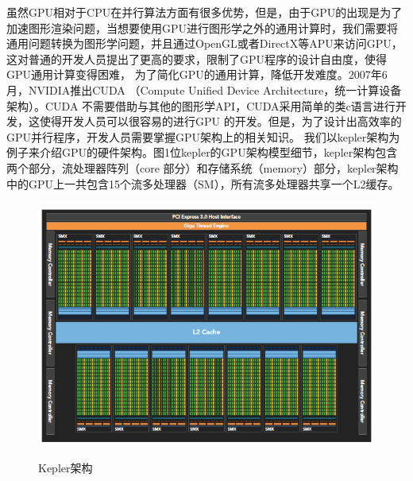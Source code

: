 虽然GPU相对于CPU在并行算法方面有很多优势，但是，由于GPU的出现是为了加速图形渲染问题，当想要使用GPU进行图形学之外的通用计算时，我们需要将通用问题转换为图形学问题，并且通过OpenGL或者DirectX等APU来访问GPU，这对普通的开发人员提出了更高的要求，限制了GPU程序的设计自由度，使得GPU通用计算变得困难，
为了简化GPU的通用计算，降低开发难度。2007年6月，NVIDIA推出CUDA （Compute Unified Device Architecture，统一计算设备架构）。CUDA 不需要借助与其他的图形学API，CUDA采用简单的类c语言进行开发，这使得开发人员可以很容易的进行GPU 的开发。但是，为了设计出高效率的GPU并行程序，开发人员需要掌握GPU架构上的相关知识。
我们以kepler架构为例子来介绍GPU的硬件架构。图1位kepler的GPU架构模型细节，kepler架构包含两个部分，流处理器阵列（core 部分）和存储系统（memory）部分，kepler架构中的GPU上一共包含15个流多处理器（SM），所有流多处理器共享一个L2缓存。
\begin{figure}
\setlength{\belowcaptionskip}{-0.5cm}
  \begin{center}
    {\includegraphics[width=1 \textwidth]{figures/arc.png}}
    \end{center}
  \caption{{\footnotesize{Kepler架构}}}
  \label{KPA}
\end{figure}
